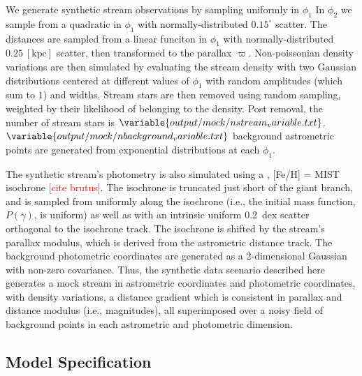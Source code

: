 \documentclass[twocolumn]{aastex631}
\newcommand{\unit}[1]{[\text{#1}]}
\newcommand{\parallax}{\varpi}
\newcommand{\TODO}[1]{{\textcolor{red}{#1}}}
\begin{document}
        We generate synthetic stream observations by sampling uniformly in $\phi_1$
        In $\phi_2$ we sample from a quadratic in $\phi_1$ with normally-distributed
        $0.15^{\circ}$ scatter.  The distances are sampled from a linear funciton in
        $\phi_1$ with normally-distributed $0.25 \ \unit{kpc}$ scatter, then
        transformed to the parallax $\parallax$.  Non-poissonian density variations
        are then simulated by evaluating the stream density with two Gaussian
        distributions centered at different values of $\phi_1$ with random
        amplitudes (which sum to $1$) and widths.  Stream stars are then removed
        using random sampling, weighted by their likelihood of belonging to the
        density. Post removal, the number of stream stars is
        $\variable{output/mock/nstream_variable.txt}$.
        $\variable{output/mock/nbackground_variable.txt}$ background astrometric points
        are generated from exponential distributions at each $\phi_1$.
    
        The synthetic stream's photometry is also simulated using a
        ,
        [Fe/H] =  MIST isochrone
        \TODO{[cite brutus]}. The isochrone is truncated just
        short of the giant branch, and is sampled from uniformly along the isochrone
        (i.e., the initial mass function, $P(\gamma)$, is uniform) as well as with
        an intrinsic uniform 0.2~dex scatter orthogonal to the isochrone track. The
        isochrone is shifted by the stream's parallax modulus, which is derived from
        the astrometric distance track.  The background photometric coordinates are
        generated as a 2-dimensional Gaussian with non-zero covariance.  Thus, the
        synthetic data scenario described here generates a mock stream in
        astrometric coordinates and photometric coordinates, with density
        variations, a distance gradient which is consistent in parallax and distance
        modulus (i.e., magnitudes), all superimposed over a noisy field of
        background points in each astrometric and photometric dimension.

    \subsection{Model Specification} \label{sub:resultes_mock:model}
\end{document}
